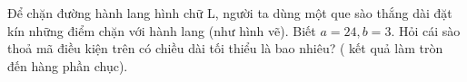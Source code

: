 \begin{question}[type=short_answer,difficulty=4,code={III-3}]
Để chặn đường hành lang hình chữ L, người ta dùng một que sào thắng dài đặt kín những điểm chặn với hành lang (như hình vẽ). Biết $ a = 24, b = 3 $. Hỏi cái sào thoả mã điều kiện trên có chiều dài tối thiểu là bao nhiêu? ( kết quả làm tròn đến hàng phần chục).




\end{question}